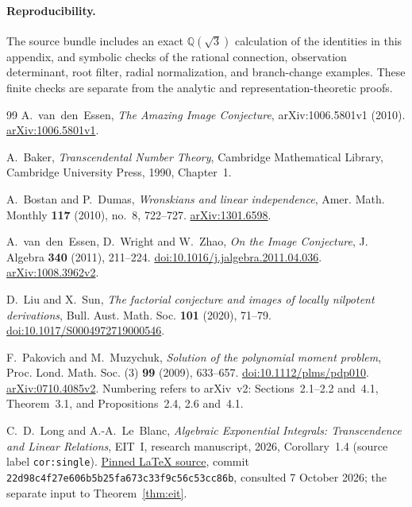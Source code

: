 \documentclass[11pt]{article}
\numberwithin{equation}{section}
\theoremstyle{definition}\newtheorem{definition}[theorem]{Definition}
\theoremstyle{remark}\newtheorem{remark}[theorem]{Remark}
\newcommand{\Q}{\mathbb Q}
\begin{document}
\paragraph{Reproducibility.}
The source bundle includes an exact $\Q(\sqrt3)$ calculation of the
identities in this appendix, and symbolic checks of the rational
connection, observation determinant, root filter, radial normalization,
and branch-change examples. These finite checks are separate from the
analytic and representation-theoretic proofs.
\small
\begin{thebibliography}{99}
A.~van~den~Essen, \emph{The Amazing Image Conjecture},
arXiv:1006.5801v1 (2010).
\href{https://arxiv.org/abs/1006.5801v1}{arXiv:1006.5801v1}.

A.~Baker, \emph{Transcendental Number Theory}, Cambridge Mathematical
Library, Cambridge University Press, 1990, Chapter~1.

A.~Bostan and P.~Dumas, \emph{Wronskians and linear independence},
Amer. Math. Monthly \textbf{117} (2010), no.~8, 722--727.
\href{https://arxiv.org/abs/1301.6598}{arXiv:1301.6598}.

A.~van~den~Essen, D.~Wright and W.~Zhao,
\emph{On the Image Conjecture}, J. Algebra \textbf{340} (2011),
211--224.
\href{https://doi.org/10.1016/j.jalgebra.2011.04.036}{doi:10.1016/j.jalgebra.2011.04.036}.
\href{https://arxiv.org/abs/1008.3962v2}{arXiv:1008.3962v2}.

D.~Liu and X.~Sun, \emph{The factorial conjecture and images of locally
nilpotent derivations}, Bull. Aust. Math. Soc. \textbf{101} (2020),
71--79.
\href{https://doi.org/10.1017/S0004972719000546}{doi:10.1017/S0004972719000546}.

F.~Pakovich and M.~Muzychuk, \emph{Solution of the polynomial moment
problem}, Proc. Lond. Math. Soc. (3) \textbf{99} (2009), 633--657.
\href{https://doi.org/10.1112/plms/pdp010}{doi:10.1112/plms/pdp010}.
\href{https://arxiv.org/abs/0710.4085v2}{arXiv:0710.4085v2}.
Numbering refers to arXiv~v2: Sections~2.1--2.2 and~4.1,
Theorem~3.1, and Propositions~2.4, 2.6 and~4.1.

C.~D.~Long and A.-A.~Le~Blanc, \emph{Algebraic Exponential Integrals:
Transcendence and Linear Relations}, EIT~I, research manuscript, 2026,
Corollary~1.4 (source label \texttt{cor:single}).
\href{https://github.com/long-mathematics/exponential-integral-theorem/blob/22d98c4f27e606b5b25fa673c33f9c56c53cc86b/papers/01-exponential-integral-theorem/exponential-integral-theorem.tex}{Pinned LaTeX source},
commit \texttt{22d98c4f27e606b5b25fa673c33f9c56c53cc86b},
consulted 7 October 2026; the separate input to Theorem~\ref{thm:eit}.


\end{thebibliography}
\end{document}
